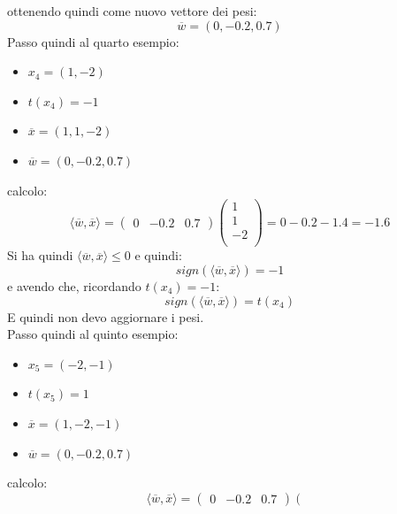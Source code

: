 \begin{esercizio}
						ottenendo quindi come nuovo vettore dei pesi:
						\[\overline{w}=(0, -0.2, 0.7)\]
						Passo quindi al quarto esempio:
						\begin{itemize}
							\item $x_4=(1,-2)$
							\item $t(x_4)=-1$
							\item $=(1, 1,-2)$
							\item $=(0, -0.2, 0.7)$
						\end{itemize}
						calcolo:
						\[\langle \overline{w}, \overline{x}\rangle=
							\left(\begin{matrix}
							0 & -0.2 & 0.7
							\end{matrix}\right)
							\left(
							\begin{matrix}
								1  \\
								1  \\
								-2 \\
							\end{matrix}
							\right)= 0-0.2-1.4 = -1.6
						\]
						Si ha quindi $\langle {}, \rangle {}$ e quindi:
						\[sign(\langle \overline{w}, \overline{x}\rangle)=-1\]
						e avendo che, ricordando $t(x_4)=-1$:
						\[sign(\langle \overline{w}, \overline{x}\rangle)= t(x_4)\]
						E quindi non devo aggiornare i pesi.\\
						Passo quindi al quinto esempio:
						\begin{itemize}
							\item $x_5=(-2,-1)$
							\item $t(x_5)=1$
							\item $=(1,-2,-1)$
							\item $=(0, -0.2, 0.7)$
						\end{itemize}
						calcolo:
						\[\langle \overline{w}, \overline{x}\rangle=
							\left(\begin{matrix}
							0 & -0.2 & 0.7
							\end{matrix}\right)
							\left(
							\begin{matrix}

\end{matrix}\]
\end{esercizio}
